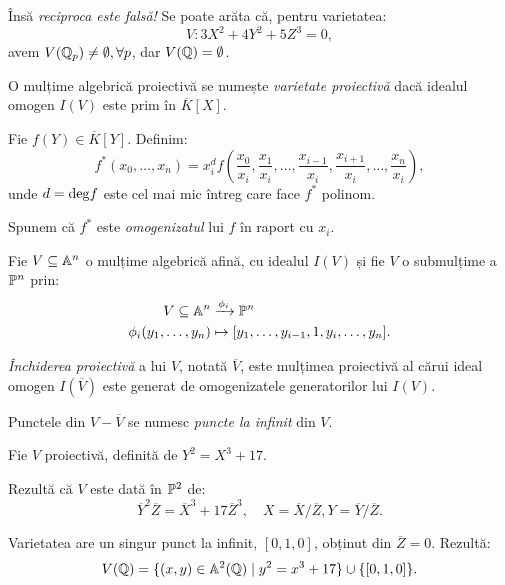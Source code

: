 Însă \emph{reciproca este falsă!} Se poate arăta că, pentru varietatea:
\[
  V: 3X^2 + 4Y^2 + 5Z^3 = 0,
\]
avem $ V(\mathbb{Q}_p) \neq \emptyset, \forall p $, dar $ V(\mathbb{Q}) = \emptyset $.

\begin{definition}\label{def:var-proj}
  O mulțime algebrică proiectivă se numește \emph{varietate proiectivă} dacă
  idealul omogen $ I(V) $ este prim în $ \overline{K}[X] $.
\end{definition}

Fie $ f(Y) \in \overline{K}[Y] $. Definim:
\[
  f^\ast(x_0, \dots, x_n) = x_i^d f \left(\dfrac{x_0}{x_i}, \dfrac{x_1}{x_i}, \dots, %
    \dfrac{x_{i - 1}}{x_i}, \dfrac{x_{i + 1}}{x_i}, \dots, \dfrac{x_n}{x_i} \right),
\]
unde $ d = \mathrm{deg}f $ este cel mai mic întreg care face $ f^\ast $ polinom.

Spunem că $ f^\ast $ este \emph{omogenizatul} lui $ f $ în raport cu $ x_i $.

\begin{definition}\label{def:inchidere-proi}
  Fie $ V \subseteq \mathbb{A}^n $ o mulțime algebrică afină, cu idealul $ I(V) $ și
  fie $ V $ o submulțime a $ \mathbb{P}^n $ prin:
  \begin{align*}
    V \subseteq \mathbb{A}^n &\xrightarrow{\phi_i} \mathbb{P}^n \\
    \phi_i(y_1, \dots, y_n) &\mapsto [y_1, \dots, y_{i-1}, 1, y_i, \dots, y_n].
  \end{align*}

  \emph{Închiderea proiectivă} a lui $ V $, notată $ \overline{V} $, este
  mulțimea proiectivă al cărui ideal omogen $ I(\overline{V}) $ este generat
  de omogenizatele generatorilor lui $ I(V) $.

  Punctele din $ V - \overline{V} $ se numesc \emph{puncte la infinit} din $ V $.
\end{definition}

\begin{example}\label{exm:punct-infinit}
  Fie $ V $ proiectivă, definită de $ Y^2 = X^3 + 17 $.

  Rezultă că $ V $ este dată în $ \mathbb{P}^2 $ de:
  \[
    \overline{Y}^2 \overline{Z} = \overline{X}^3 + 17 \overline{Z}^3, \quad %
    X = \overline{X}/\overline{Z}, Y = \overline{Y}/\overline{Z}.
  \]

  Varietatea are un singur punct la infinit, $ [0, 1, 0] $, obținut din
  $ \overline{Z} = 0 $. Rezultă:
  \[
    V(\mathbb{Q}) = \{ (x, y) \in \mathbb{A}^2(\mathbb{Q}) \mid y^2 = x^3 + 17 \} \cup \{ [0, 1, 0] \}.
  \]
\end{example}

